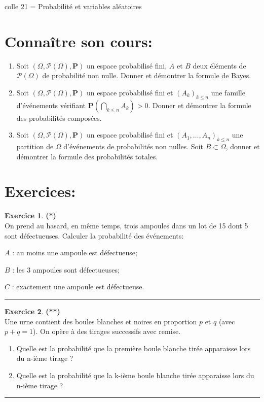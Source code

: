 \documentclass[a4paper,11pt]{article}
\theoremstyle{definition}
\newtheorem{exo}{Exercice} %
\newcommand{\Pb}{\mathbf{P}}
\begin{document}
	
	
	\begin{center}
		\Large \sc colle 21 = Probabilité et variables aléatoires 
	\end{center}
\raggedright


\section*{Connaître son cours:}
\begin{enumerate}
\item Soit $(\Omega, \mathcal P(\Omega),\Pb)$ un espace probabilisé fini, $A$ et $B$ deux éléments de $\mathcal P(\Omega)$ de probabilité non nulle. Donner et démontrer la formule de Bayes.
\item Soit $(\Omega, \mathcal P(\Omega),\Pb)$ un espace probabilisé fini et $(A_k )_{k\leq n}$ une famille d’événements vérifiant $\displaystyle\Pb\left(\underset{k\leq n}{\bigcap} A_k \right) >   0$. Donner et démontrer la formule des probabilités composées. 
\item Soit $(\Omega, \mathcal P(\Omega),\Pb)$ un espace probabilisé fini et $(A_1,\dots,A_n)_{k\leq n}$ une partition de $\Omega$ d’événements de probabilités non nulles. Soit $B \subset \Omega$, donner et démontrer la formule des probabilités totales.
\hfill \\[-1.5cm]
\end{enumerate}


\section*{Exercices:} 	

\begin{exo}\textbf{(*)}\quad\\[0.15cm]
	On prend au hasard, en même temps, trois ampoules dans un lot de 15 dont
	5 sont défectueuses. Calculer la probabilité des événements:
	
	$A$ : au moins une ampoule est défectueuse;
	
	$B$ : les 3 ampoules sont défectueuses;
	
	$C$ : exactement une ampoule est défectueuse.
	
	\centering
	\rule{1\linewidth}{0.6pt}
\end{exo}


\begin{exo}\textbf{(**)}\quad\\[0.15cm]%
	Une urne contient des boules blanches et noires en proportion $p$ et $q$ (avec
	$p + q = 1$). On opère à des tirages successifs avec remise.
	\begin{enumerate}
		\item Quelle est la probabilité que la première boule blanche tirée apparaisse lors
		du n-ième tirage ?
		\item Quelle est la probabilité que la k-ième boule blanche tirée apparaisse lors du
		n-ième tirage ?
	\end{enumerate}


	\centering
\rule{1\linewidth}{0.6pt}
\end{exo}
\end{document}
